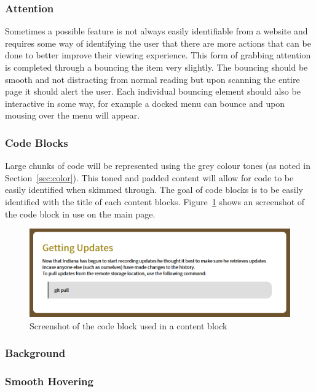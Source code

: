 \subsubsection{Attention}
Sometimes a possible feature is not always easily identifiable from a website and requires some way of identifying the user that there are more actions that can be done to better improve their viewing experience. This form of grabbing attention is completed through a bouncing the item very slightly. The bouncing should be smooth and not distracting from normal reading but upon scanning the entire page it should alert the user. Each individual bouncing element should also be interactive in some way, for example a docked menu can bounce and upon mousing over the menu will appear.

\subsubsection{Code Blocks}
Large chunks of code will be represented using the grey colour tones (as noted in Section~\ref{sec:color}). This toned and padded content will allow for code to be easily identified when skimmed through. The goal of code blocks is to be easily identified with the title of each content blocks. Figure~\ref{fig:codeblock} shows an screenshot of the code block in use on the main page.

\begin{figure}
	\centering
	\includegraphics[width=0.8\linewidth]{web1}
	\caption{Screenshot of the code block used in a content block}\label{fig:codeblock}
\end{figure}


\subsubsection{Background}


\subsubsection{Smooth Hovering}

